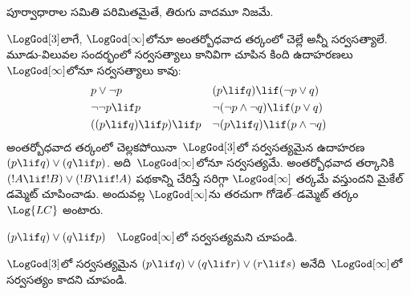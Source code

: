 \documentclass[../../../include/open-logic-section]{subfiles}
\begin{document}
పూర్వాధారాల సమితి పరిమితమైతే, తిరుగు వాదమూ నిజమే.

$\LogGod[3]$లాగే, $\LogGod[\infty]$లోనూ
అంతర్బోధవాద తర్కంలో చెల్లే
అన్నీ సర్వసత్యాలే. మూడు-విలువల సందర్భంలో సర్వసత్యాలు కానివిగా
చూపిన కింది ఉదాహరణలు~$\LogGod[\infty]$లోనూ సర్వసత్యాలు కావు:
\begin{align*}
  & p \lor \lnot p && (p \lif q) \lif (\lnot p \lor q) \\
  & \lnot\lnot p \lif p && \lnot(\lnot p \land \lnot q) \lif (p \lor q) \\
  & ((p \lif q) \lif p) \lif p && \lnot(p \lif q) \lif (p \land \lnot q)
\end{align*}
అంతర్బోధవాద తర్కంలో చెల్లకపోయినా~$\LogGod[3]$లో
సర్వసత్యమైన  ఉదాహరణ
$(p \lif q) \lor (q \lif
p)$. అది~$\LogGod[\infty]$లోనూ సర్వసత్యమే.
అంతర్బోధవాద తర్కానికి $(!A \lif !B) \lor (!B \lif !A)$
పథకాన్ని చేరిస్తే సరిగ్గా $\LogGod[\infty]$ తర్కమే వస్తుందని
మైకేల్ డమ్మెట్ చూపించాడు. అందువల్ల $\LogGod[\infty]$ను
తరచుగా గోడెల్--డమ్మెట్ తర్కం~$\Log{LC}$ అంటారు.

\begin{prob}
  $(p \lif q) \lor (q \lif p)$
  ~$\LogGod[\infty]$లో సర్వసత్యమని
  చూపండి.
\end{prob}

\begin{prob}
  $\LogGod[3]$లో సర్వసత్యమైన
  $(p \lif q) \lor (q \lif r) \lor (r \lif s)$
  అనేది~$\LogGod[\infty]$లో
  సర్వసత్యం కాదని చూపండి.
\end{prob}
\end{document}
